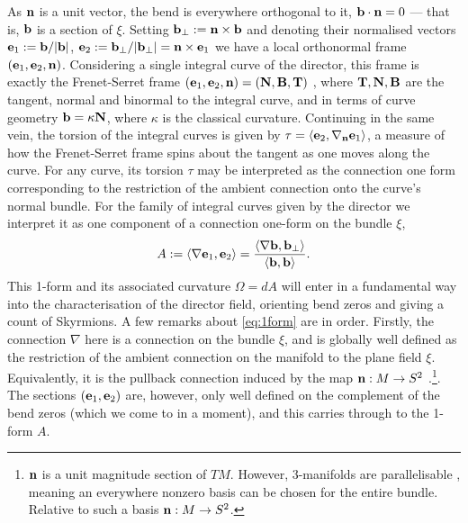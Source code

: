 As ${\bf n}$ is a unit vector, the bend is everywhere orthogonal to it, ${\bf b}\cdot{\bf n}=0$ --- that is, $\mathbf{b}$ is a section of $\xi$. Setting ${\bf b}_\perp:={\bf n}\times{\mathbf{b}}$ and denoting their normalised vectors ${\bf e}_1 := \mathbf{b}/|\mathbf{b}|$, $\mathbf{e}_2 := \mathbf{b}_\perp/|\mathbf{b}_\perp| = \mathbf{n} \times \mathbf{e}_1$ we have a local orthonormal frame $({\bf e}_1, {\bf e}_2, {\bf n})$. Considering a single integral curve of the director, this frame is exactly the Frenet-Serret frame $({\bf e}_1, {\bf e}_2,{\bf n}) = (\mathbf{N}, \mathbf{B}, \mathbf{T})$ \citep{DoCarmoBook}, where $\mathbf{T}, \mathbf{N}, \mathbf{B}$ are the tangent, normal and binormal to the integral curve, and in terms of curve geometry $\mathbf{b} = \kappa \mathbf{N}$, where $\kappa$ is the classical curvature. Continuing in the same vein, the torsion of the integral curves is given by $\tau  = \langle \mathbf{e}_2 , \nabla_{\mathbf{n}} \mathbf{e}_1 \rangle $, a measure of how the Frenet-Serret frame spins about the tangent as one moves along the curve. For any curve, its torsion $\tau$ may be interpreted as the connection one form corresponding to the restriction of the ambient connection onto the curve's normal bundle. For the family of integral curves given by the director we interpret it as one component of a connection one-form on the bundle $\xi$,  
\begin{equation}
    A := \langle \nabla \mathbf{e}_1 ,\mathbf{e}_2 \rangle = \frac{\langle \nabla \mathbf{b} ,\mathbf{b}_\perp \rangle}{\langle \mathbf{b},\mathbf{b} \rangle}. 
    \label{eq:1form}
\end{equation}
This 1-form and its associated curvature $\Omega = dA$ will enter in a fundamental way into the characterisation of the director field, orienting bend zeros and giving a count of Skyrmions. A few remarks about \eqref{eq:1form} are in order. Firstly, the connection $\nabla$ here is a connection on the bundle $\xi$, and is globally well defined as the restriction of the ambient connection on the manifold to the plane field $\xi$. Equivalently, it is the pullback connection induced by the map ${\bf n}: M \rightarrow S^2$ \citep{Lee1996}.\footnote{$\mathbf{n}$ is a unit magnitude section of $TM$. However, 3-manifolds are parallelisable \citep{Geiges2009}, meaning an everywhere nonzero basis can be chosen for the entire bundle. Relative to such a basis $\mathbf{n}: M \rightarrow S^2$.}. The sections $(\mathbf{e}_1,\mathbf{e}_2)$ are, however, only well defined on the complement of the bend zeros (which we come to in a moment), and this carries through to the 1-form $A$. 

